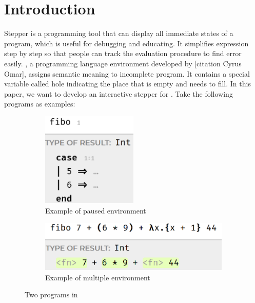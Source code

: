 \section{Introduction}

Stepper is a programming tool that can display all immediate states of a program, which is useful for debugging and educating. It simplifies expression step by step so that people can track the evaluation procedure to find error easily. \Hazel, a programming language environment developed by [citation Cyrus Omar], assigns semantic meaning to incomplete program. It contains a special variable called hole indicating the place that is empty and needs to fill. In this paper, we want to develop an interactive stepper for \Hazel. Take the following programs as examples:

\begin{figure}[htbp]
  \centering
  \begin{subfigure}[b]{0.4\textwidth}
      \centering
      \includegraphics[width=0.5\textwidth]{img/pause_example.png}
      \caption{Example of paused environment}
      \label{fig:pause}
  \end{subfigure}
  \hfill
  \begin{subfigure}[b]{0.4\textwidth}
      \centering
      \includegraphics[width=\textwidth]{img/interactive.png}
      \caption{Example of multiple environment}
      \label{fig:multiple}
  \end{subfigure}
    \caption{Two programs in \Hazel}
    \label{fig:intro_example}
\end{figure}

